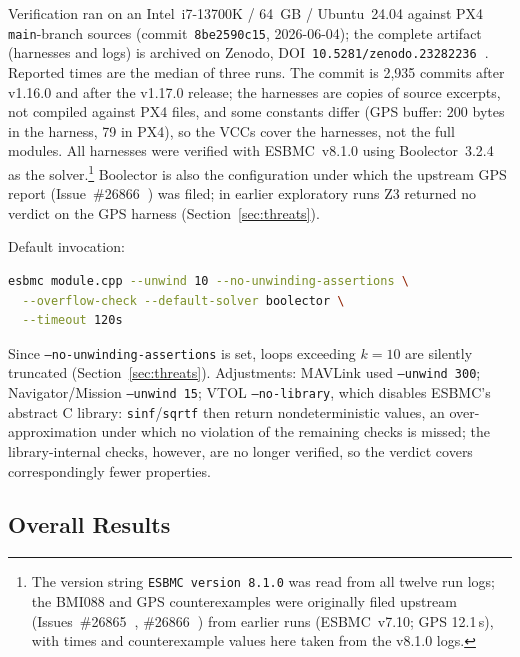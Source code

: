 \documentclass[conference]{IEEEtran}
\begin{document}
Verification ran on an Intel~i7-13700K / 64~GB / Ubuntu~24.04
against PX4 \texttt{main}-branch sources (commit~\texttt{8be2590c15},
2026-06-04); the complete artifact (harnesses and logs) is
archived on Zenodo, DOI~\texttt{10.5281/zenodo.23282236}\textbf{~\cite{Zenodo2026}}.
Reported times are the median of three runs. The commit is
2{,}935 commits after v1.16.0 and after the v1.17.0 release;
the harnesses are copies of source excerpts, not compiled
against PX4 files, and some constants differ (GPS buffer: 200
bytes in the harness, 79 in PX4), so the VCCs cover the
harnesses, not the full modules. All harnesses were verified
with ESBMC~v8.1.0 using Boolector~3.2.4~\cite{Brummayer2009} as the
solver.\footnote{The version string \texttt{ESBMC version 8.1.0} was read
from all twelve run logs; the BMI088 and GPS counterexamples were
originally filed upstream (Issues~\#26865\textbf{~\cite{PX4_Issue26865}},
\#26866\textbf{~\cite{PX4_Issue26866}}) from earlier runs (ESBMC~v7.10;
GPS 12.1\,s), with times and counterexample values here taken from the
v8.1.0 logs.}
Boolector is also the configuration under which the upstream
GPS report (Issue~\#26866\textbf{~\cite{PX4_Issue26866}}) was filed; in earlier exploratory
runs Z3 returned no verdict on the GPS harness
(Section~\ref{sec:threats}). \
\noindent\begin{minipage}{\columnwidth}
Default invocation:
\begin{lstlisting}[language=bash,breaklines=true]
esbmc module.cpp --unwind 10 --no-unwinding-assertions \
  --overflow-check --default-solver boolector \
  --timeout 120s
\end{lstlisting}
\end{minipage}
Since \texttt{--no-unwinding-assertions} is set, loops exceeding
$k=10$ are silently truncated (Section~\ref{sec:threats}).
Adjustments: MAVLink used \texttt{--unwind~300}; Navigator/Mission
\texttt{--unwind~15}; VTOL \texttt{--no-library}, which disables
ESBMC's abstract C library: \texttt{sinf}/\texttt{sqrtf} then return
nondeterministic values, an over-approximation under which no
violation of the remaining checks is missed; the
library-internal checks, however, are no longer verified, so the verdict covers correspondingly fewer properties.
\subsection{Overall Results}
\label{subsec:overall}
\end{document}
